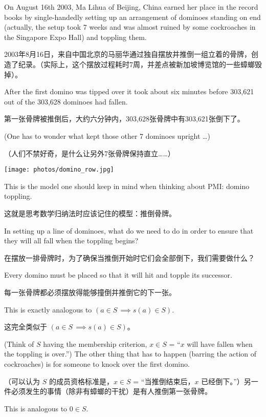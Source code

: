 On August 16th 2003, Ma Lihua of Beijing, China earned her place in the 
record books by single-handedly setting up an arrangement of dominoes 
standing on end (actually, the setup took 7 weeks and was almost ruined by
some cockroaches in the Singapore Expo Hall) and toppling them.

2003年8月16日，来自中国北京的马丽华通过独自摆放并推倒一组立着的骨牌，创造了纪录。（实际上，这个摆放过程耗时7周，并差点被新加坡博览馆的一些蟑螂毁掉）。

After the first domino was tipped over it took about six minutes
before 303,621 out of the 303,628 dominoes had fallen.

第一张骨牌被推倒后，大约六分钟内，303,628张骨牌中有303,621张倒下了。

(One has to wonder 
what kept those other 7 dominoes upright \ldots)  

（人们不禁好奇，是什么让另外7张骨牌保持直立……）

\begin{center}
\texttt{[image: photos/domino\_row.jpg]}
\end{center}

This is the model one should keep in mind when thinking about PMI: domino
toppling.

这就是思考数学归纳法时应该记住的模型：推倒骨牌。

In setting up a line of dominoes, what do we need to do
in order to ensure that they will all fall when the toppling begins?

在摆放一排骨牌时，为了确保当推倒开始时它们会全部倒下，我们需要做什么？

Every domino must be placed so that it will hit and topple its successor.

每一张骨牌都必须摆放得能够撞倒并推倒它的下一张。

This is exactly analogous to $(a \in S \, \implies s(a) \in S)$.

这完全类似于 $(a \in S \, \implies s(a) \in S)$。

(Think 
of $S$ having the membership criterion, $x \in S$ = ``$x$ will have fallen
when the toppling is over.'')   The other thing that has to happen
(barring the action of cockroaches) is for someone to knock over the
first domino.

（可以认为 $S$ 的成员资格标准是，$x \in S$ = “当推倒结束后，$x$ 已经倒下。”）另一件必须发生的事情（除非有蟑螂的干扰）是有人推倒第一张骨牌。

This is analogous to $0 \in S$.

